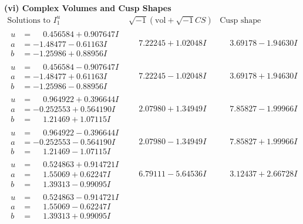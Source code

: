 \documentclass[1p]{elsarticle_modified}
\theoremstyle{definition}
\newcommand{\I}{\sqrt{-1}}
\begin{document}
\newpage\flushleft \textbf{(vi) Complex Volumes and Cusp Shapes}
$$\begin{array}{c|c|c}  
\text{Solutions to }I^u_{1}& \I (\text{vol} + \sqrt{-1}CS) & \text{Cusp shape}\\
 \hline 
\begin{aligned}
u &= \phantom{-}0.456584 + 0.907647 I \\
a &= -1.48477 - 0.61163 I \\
b &= -1.25986 + 0.88956 I\end{aligned}
 & \phantom{-}7.22245 + 1.02048 I & \phantom{-}3.69178 - 1.94630 I \\ \hline\begin{aligned}
u &= \phantom{-}0.456584 - 0.907647 I \\
a &= -1.48477 + 0.61163 I \\
b &= -1.25986 - 0.88956 I\end{aligned}
 & \phantom{-}7.22245 - 1.02048 I & \phantom{-}3.69178 + 1.94630 I \\ \hline\begin{aligned}
u &= \phantom{-}0.964922 + 0.396644 I \\
a &= -0.252553 + 0.564190 I \\
b &= \phantom{-}1.21469 + 1.07115 I\end{aligned}
 & \phantom{-}2.07980 + 1.34949 I & \phantom{-}7.85827 - 1.99966 I \\ \hline\begin{aligned}
u &= \phantom{-}0.964922 - 0.396644 I \\
a &= -0.252553 - 0.564190 I \\
b &= \phantom{-}1.21469 - 1.07115 I\end{aligned}
 & \phantom{-}2.07980 - 1.34949 I & \phantom{-}7.85827 + 1.99966 I \\ \hline\begin{aligned}
u &= \phantom{-}0.524863 + 0.914721 I \\
a &= \phantom{-}1.55069 + 0.62247 I \\
b &= \phantom{-}1.39313 - 0.99095 I\end{aligned}
 & \phantom{-}6.79111 - 5.64536 I & \phantom{-}3.12437 + 2.66728 I \\ \hline\begin{aligned}
u &= \phantom{-}0.524863 - 0.914721 I \\
a &= \phantom{-}1.55069 - 0.62247 I \\
b &= \phantom{-}1.39313 + 0.99095 I\end{aligned}

\end{array}$$
\end{document}
